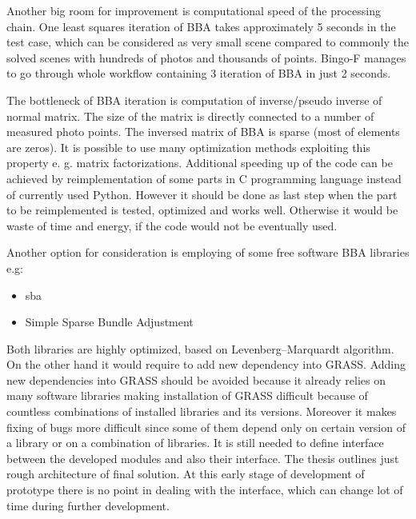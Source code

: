 \documentclass[a4paper,12pt]{article}
\begin{document}
Another big room for improvement is computational speed of the processing chain.
One least squares  iteration of BBA takes approximately 5 seconds in the test case, which can be 
considered as very small scene compared to commonly the solved
scenes with hundreds of photos and thousands of points. Bingo-F manages to go through whole workflow containing 
3 iteration of BBA in just 2 seconds.

The bottleneck of BBA iteration is computation of inverse/pseudo inverse of normal matrix.
The size of the matrix is directly connected to a number of measured photo points.
The inversed matrix of BBA is sparse (most of elements are zeros).
It is possible to use many optimization methods exploiting this property e. g. matrix factorizations. 
Additional speeding up of the code can be achieved by reimplementation of some parts in C programming language 
instead of currently used Python. However it should be done 
as last step when the part to be reimplemented is tested, optimized and works well. Otherwise it would be waste of time and energy, if the 
code would not be eventually used. 


Another option  for consideration is employing of some free software BBA libraries e.g:
\begin{itemize}
\item sba 
\item Simple Sparse Bundle Adjustment 
\end{itemize}

Both libraries are highly optimized, based on Levenberg–Marquardt algorithm.
On the other hand it would require to add new dependency into GRASS. 
Adding new dependencies into GRASS should be avoided because it already relies on many software libraries
 making installation of GRASS difficult because of countless combinations of installed libraries and its versions.
 Moreover it makes fixing of bugs more difficult since some of them
 depend only on certain version of  a library or on a combination of libraries. 
 It is still needed to define interface between the developed modules and also their interface. 
The thesis outlines just rough architecture of final solution. At this early stage of development of 
prototype
there is no point in dealing with the interface, which can change lot of time during further development.
\end{document}
